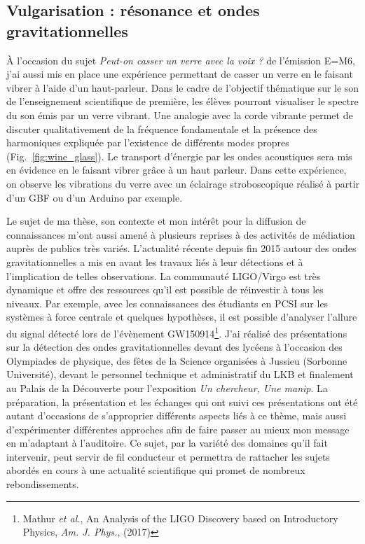 \documentclass[12pt,a4paper]{article}
\begin{document}
\subsection{Vulgarisation : résonance et ondes gravitationnelles}

À l'occasion du sujet \textit{Peut-on casser un verre avec la voix ?} de l'émission E=M6, j'ai aussi mis en place une expérience permettant de casser un verre en le faisant vibrer à l'aide d'un haut-parleur.
Dans le cadre de l'objectif thématique sur le son de l'enseignement scientifique de première, les élèves pourront visualiser le spectre du son émis par un verre vibrant.
Une analogie avec la corde vibrante permet de discuter qualitativement de la fréquence fondamentale et la présence des harmoniques expliquée par l'existence de différents modes propres (Fig.~\ref{fig:wine_glass}).
Le transport d'énergie par les ondes acoustiques sera mis en évidence en le faisant vibrer grâce à un haut parleur.
Dans cette expérience, on observe les vibrations du verre avec un éclairage stroboscopique réalisé à partir d'un GBF ou d'un Arduino par exemple.

Le sujet de ma thèse, son contexte et mon intérêt pour la diffusion de connaissances m'ont aussi amené à plusieurs reprises à des activités de médiation auprès de publics très variés.
L'actualité récente depuis fin 2015 autour des ondes gravitationnelles a mis en avant les travaux liés à leur détections et à l'implication de telles observations.
La communauté LIGO/Virgo est très dynamique et offre des ressources qu'il est possible de réinvestir à tous les niveaux.
Par exemple, avec les connaissances des étudiants en PCSI sur les systèmes à force centrale et quelques hypothèses, il est possible d'analyser l'allure du signal détecté lors de l'évènement GW150914\footnote{Mathur \textit{et al.}, An Analysis of the LIGO Discovery based on Introductory Physics, \textit{Am. J. Phys.}, (2017)}.
J'ai réalisé des présentations sur la détection des ondes gravitationnelles devant des lycéens à l'occasion des Olympiades de physique, des fêtes de la Science organisées à Jussieu (Sorbonne Université), devant le personnel technique et administratif du LKB et finalement au Palais de la Découverte pour l'exposition \textit{Un chercheur, Une manip}.
La préparation, la présentation et les échanges qui ont suivi ces présentations ont été autant d'occasions de s'approprier différents aspects liés à ce thème, mais aussi d'expérimenter différentes approches afin de faire passer au mieux mon message en m'adaptant à l'auditoire.
Ce sujet, par la variété des domaines qu'il fait intervenir, peut servir de fil conducteur et permettra de rattacher les sujets abordés en cours à une actualité scientifique qui promet de nombreux rebondissements.
\end{document}
